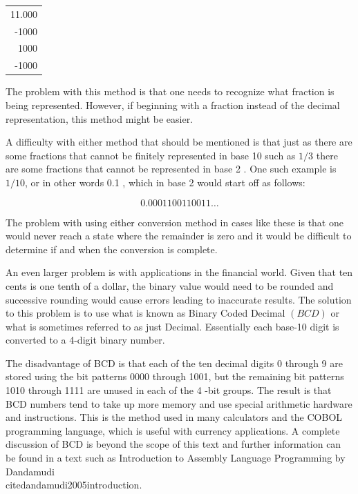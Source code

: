 \documentclass[10pt]{book}
\begin{document}
\begin{center}
\begin{tabular}{r}
11.000 \\
-1000 \\
\hline
1000 \\
-1000 \\
\hline
\end{tabular}
\end{center}

The problem with this method is that one needs to recognize what fraction is being represented. However, if beginning with a fraction instead of the decimal representation, this method might be easier.

A difficulty with either method that should be mentioned is that just as there are some fractions that cannot be finitely represented in base 10 such as $1 / 3$ there are some fractions that cannot be represented in base 2 . One such example is $1 / 10$, or in other words 0.1 , which in base 2 would start off as follows:

$$
0.0001100110011 \ldots
$$

The problem with using either conversion method in cases like these is that one would never reach a state where the remainder is zero and it would be difficult to determine if and when the conversion is complete.

An even larger problem is with applications in the financial world. Given that ten cents is one tenth of a dollar, the binary value would need to be rounded and successive rounding would cause errors leading to inaccurate results. The solution to this problem is to use what is known as Binary Coded Decimal $(B C D)$ or what is sometimes referred to as just Decimal. Essentially each base-10 digit is converted to a 4-digit binary number.

The disadvantage of BCD is that each of the ten decimal digits 0 through 9 are stored using the bit patterns 0000 through 1001, but the remaining bit patterns 1010 through 1111 are unused in each of the 4 -bit groups. The result is that BCD numbers tend to take up more memory and use special arithmetic hardware and instructions. This is the method used in many calculators and the COBOL programming language, which is useful with currency applications. A complete discussion of BCD is beyond the scope of this text and further information can be found in a text such as Introduction to Assembly Language Programming by Dandamudi \\cite{dandamudi2005introduction}.
\end{document}
